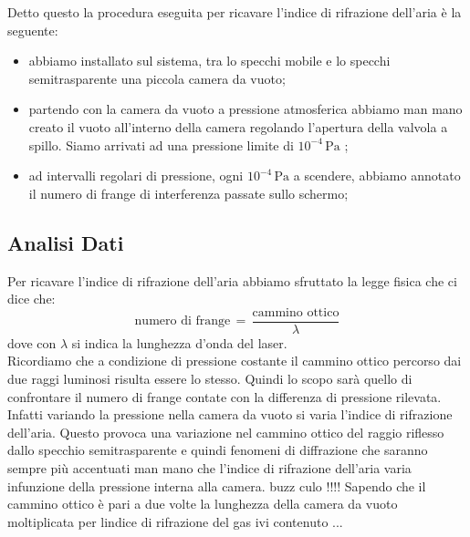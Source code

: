 Detto questo la procedura eseguita per ricavare l'indice di rifrazione dell'aria è la seguente:
\begin{itemize}
	\item{abbiamo installato sul sistema, tra lo specchi mobile e lo specchi semitrasparente una piccola camera da vuoto;} %
	\item{partendo con la camera da vuoto a pressione atmosferica abbiamo man mano creato il vuoto all'interno della camera regolando l'apertura della valvola a spillo. Siamo arrivati ad una pressione limite di $10^{-4}\, \si{\pascal}$ ;}
	\item{ad intervalli regolari di pressione, ogni $10^{-4}\, \si{\pascal}$ a scendere, abbiamo annotato il numero di frange di interferenza passate sullo schermo;}
\end{itemize}

\subsection{Analisi Dati}

Per ricavare l'indice di rifrazione dell'aria abbiamo sfruttato la legge fisica che ci dice che:
\begin{equation}
	\text{numero di frange} \,=\, \frac{\text{cammino ottico}}{\lambda}
\end{equation}
dove con $\lambda$ si indica la lunghezza d'onda del laser.\\

Ricordiamo che a condizione di pressione costante il cammino ottico percorso dai due raggi luminosi risulta essere lo stesso.
Quindi lo scopo sarà quello di confrontare il numero di frange contate con la differenza di pressione rilevata. Infatti variando la pressione nella camera da vuoto si varia l'indice di rifrazione dell'aria. Questo provoca una variazione nel cammino ottico del raggio riflesso dallo specchio semitrasparente e quindi fenomeni di diffrazione che saranno sempre più accentuati man mano che l'indice di rifrazione dell'aria varia infunzione della pressione interna alla camera. buzz culo !!!!
Sapendo che il cammino ottico è pari a due volte la lunghezza della camera da vuoto moltiplicata per lindice di rifrazione del gas ivi contenuto ...